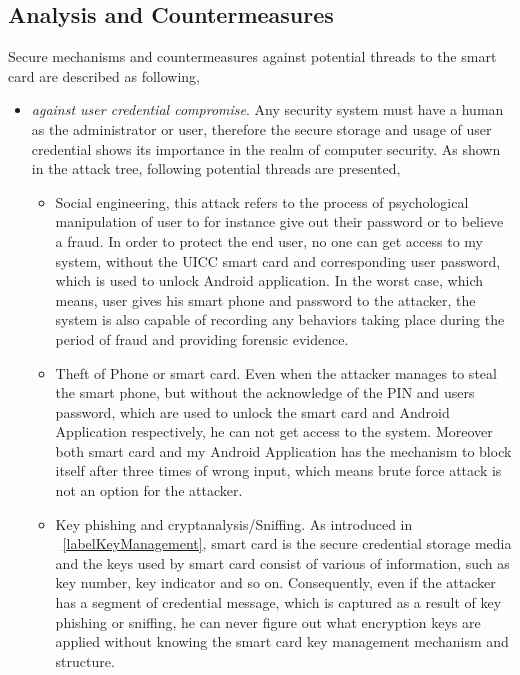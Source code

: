 \subsection{Analysis and Countermeasures}
Secure mechanisms and countermeasures against potential threads to the smart card are described as following,
\begin{itemize}
\item \emph{against user credential compromise}. Any security system must have a human as the administrator or user, therefore the secure storage and usage of user credential shows its importance in the realm of computer security. As shown in the attack tree, following potential threads are presented,
\begin{itemize}
\item Social engineering, this attack refers to the process of psychological manipulation of user to for instance give out their password or to believe a fraud. In order to protect the end user, no one can get access to my system, without the UICC smart card and corresponding user password, which is used to unlock Android  application. In the worst case, which means, user gives his smart phone and password to the attacker, the system is also capable of recording any behaviors taking place during the period of fraud and providing forensic evidence.
\item Theft of Phone or smart card. Even when the attacker manages to steal the smart phone, but without the acknowledge of the PIN and users password, which are used to unlock the smart card and Android Application respectively, he can not get access to the system. Moreover both smart card and my Android Application has the mechanism to block itself after three times of wrong input, which means brute force attack is not an option for the attacker.
\item Key phishing and cryptanalysis/Sniffing. As introduced in ~\ref{labelKeyManagement}, smart card is the secure  credential  storage media and the keys used by smart card consist of various of information, such as key number, key indicator and so on. Consequently, even if the attacker has a segment of credential message, which is captured as a result of key phishing or sniffing, he can never figure out what encryption keys are applied without knowing the smart card key management mechanism and structure.
\end{itemize}

\end{itemize}
